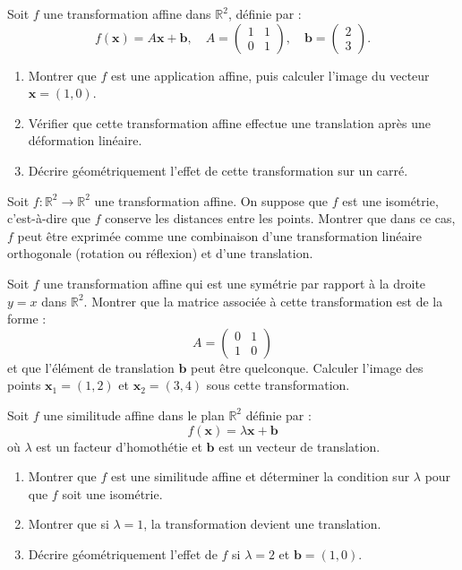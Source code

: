 \begin{exercice}
Soit \( f \) une transformation affine dans \( \mathbb{R}^2 \), définie par :
\[
f(\mathbf{x}) = A \mathbf{x} + \mathbf{b}, \quad A = \begin{pmatrix} 1 & 1 \\ 0 & 1 \end{pmatrix}, \quad \mathbf{b} = \begin{pmatrix} 2 \\ 3 \end{pmatrix}.
\]
\begin{enumerate}
    \item Montrer que \( f \) est une application affine, puis calculer l'image du vecteur \( \mathbf{x} = (1, 0) \).
    \item Vérifier que cette transformation affine effectue une translation après une déformation linéaire.
    \item Décrire géométriquement l'effet de cette transformation sur un carré.
\end{enumerate}
\end{exercice}

\begin{exercice}
Soit \( f : \mathbb{R}^2 \to \mathbb{R}^2 \) une transformation affine. On suppose que \( f \) est une isométrie, c'est-à-dire que \( f \) conserve les distances entre les points. Montrer que dans ce cas, \( f \) peut être exprimée comme une combinaison d'une transformation linéaire orthogonale (rotation ou réflexion) et d'une translation. 
\end{exercice}

\begin{exercice}
Soit \( f \) une transformation affine qui est une symétrie par rapport à la droite \( y = x \) dans \( \mathbb{R}^2 \). Montrer que la matrice associée à cette transformation est de la forme :
\[
A = \begin{pmatrix} 0 & 1 \\ 1 & 0 \end{pmatrix}
\]
et que l'élément de translation \( \mathbf{b} \) peut être quelconque. Calculer l'image des points \( \mathbf{x}_1 = (1, 2) \) et \( \mathbf{x}_2 = (3, 4) \) sous cette transformation.
\end{exercice}

\begin{exercice}
Soit \( f \) une similitude affine dans le plan \( \mathbb{R}^2 \) définie par :
\[
f(\mathbf{x}) = \lambda \mathbf{x} + \mathbf{b}
\]
où \( \lambda \) est un facteur d'homothétie et \( \mathbf{b} \) est un vecteur de translation.
\begin{enumerate}
    \item Montrer que \( f \) est une similitude affine et déterminer la condition sur \( \lambda \) pour que \( f \) soit une isométrie.
    \item Montrer que si \( \lambda = 1 \), la transformation devient une translation.
    \item Décrire géométriquement l'effet de \( f \) si \( \lambda = 2 \) et \( \mathbf{b} = (1, 0) \).
\end{enumerate}
\end{exercice}

